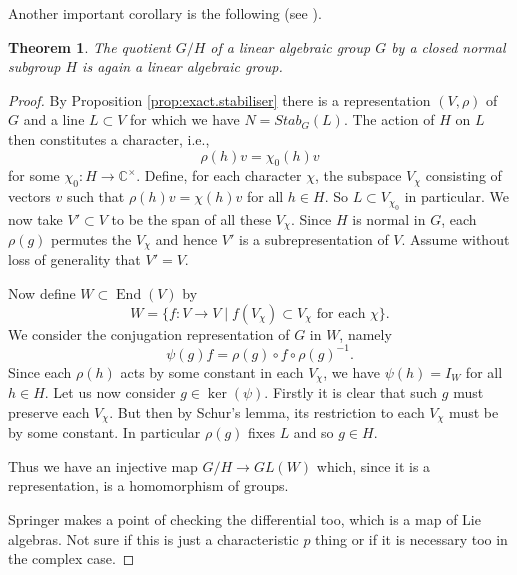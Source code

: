 \documentclass[12pt]{article}
\theoremstyle{plain}
\newtheorem{thm}{Theorem}[section]
\theoremstyle{definition}
\numberwithin{equation}{section}
\DeclareMathOperator{\en}{End}
\newcommand{\C}{\mathbb{C}}
\begin{document}
Another important corollary is the following (see {\cite[Proposition 5.5.10]{Springer}}).
\begin{thm}\label{thm:normal.affine}
The quotient $G/H$ of a linear algebraic group $G$ by a closed normal subgroup $H$ is again a linear algebraic group.
\end{thm}


\begin{proof}
By Proposition \ref{prop:exact.stabiliser} there is a representation $(V, \rho)$ of $G$ and a line $L \subset V$ for which we have $N = Stab_G(L)$. The action of $H$ on $L$ then constitutes a character, i.e.,
\[
\rho(h) v = \chi_0(h) v
\]
for some $\chi_0 : H \rightarrow \C^\times$. Define, for each character $\chi$, the subspace $V_\chi$ consisting of vectors $v$ such that $\rho(h) v = \chi(h) v$ for all $h \in H$. So $L \subset V_{\chi_0}$ in particular. We now take $V' \subset V$ to be the span of all these $V_\chi$. Since $H$ is normal in $G$, each $\rho(g)$ permutes the $V_\chi$ and hence $V'$ is a subrepresentation of $V$. Assume without loss of generality that $V' = V$.

Now define $W \subset \en(V)$ by
\[
W = \{f : V \rightarrow V \mid \text{$f(V_\chi) \subset V_\chi$ for each $\chi$}\}.
\]
We consider the conjugation representation of $G$ in $W$, namely
\[
\psi(g)f = \rho(g) \circ f \circ \rho(g)^{-1}.
\]
Since each $\rho(h)$ acts by some constant in each $V_\chi$, we have $\psi(h) = I_W$ for all $h \in H$. Let us now consider $g \in \ker(\psi)$. Firstly it is clear that such $g$ must preserve each $V_\chi$. But then by Schur's lemma, its restriction to each $V_\chi$ must be by some constant. In particular $\rho(g)$ fixes $L$ and so $g \in H$.

Thus we have an injective map $G / H \rightarrow GL(W)$ which, since it is a representation, is a homomorphism of groups.

{\color{red}Springer makes a point of checking the differential too, which is a map of Lie algebras. Not sure if this is just a characteristic $p$ thing or if it is necessary too in the complex case.}
\end{proof}
\end{document}

